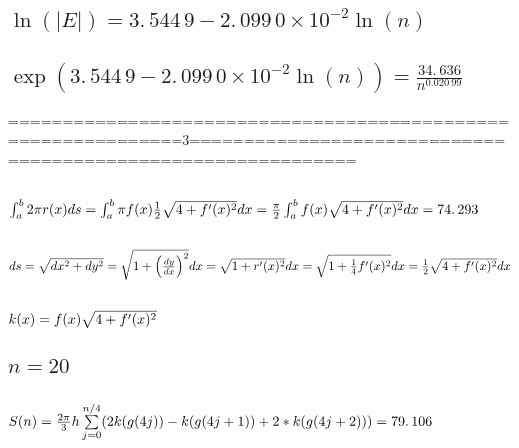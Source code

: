 \documentclass{article}
\begin{document}
\subsection{$\ln (|E|)=3.\,\allowbreak 544\,9-2.\,\allowbreak 099\,0\times
10^{-2}\ln (n)$}

\subsection{$\exp (3.\,\allowbreak 544\,9-2.\,\allowbreak 099\,0\times
10^{-2}\ln (n))=\allowbreak \frac{34.\,\allowbreak 636}{n^{0.020\,99}}$}

==============================================================3=============================================================

\bigskip

\subsection{$\protect\int_{a}^{b}2\protect\pi r(x)ds=\protect\int_{a}^{b}%
\protect\pi f(x)\frac{1}{2}\protect\sqrt{4+f^{\prime }(x)^{2}}dx=\frac{%
\protect\pi }{2}\protect\int_{a}^{b}f(x)\protect\sqrt{4+f^{\prime }(x)^{2}}%
dx=\allowbreak 74.\,\allowbreak 293$}

\subsection{$ds=\protect\sqrt{dx^{2}+dy^{2}}=\protect\sqrt{1+\left( \frac{dy%
}{dx}\right) ^{2}}dx=\protect\sqrt{1+r^{\prime }(x)^{2}}dx=\protect\sqrt{1+%
\frac{1}{4}f^{\prime }(x)^{2}}dx=\frac{1}{2}\protect\sqrt{4+f^{\prime
}(x)^{2}}dx$}

\subsection{$k(x)=f(x)\protect\sqrt{4+f^{\prime }(x)^{2}}$}

\bigskip

\bigskip

\subsection{$n=20$}

\subsection{$S(n)=\frac{2\protect\pi }{3}h\sum%
\limits_{j=0}^{n/4}(2k(g(4j))-k(g(4j+1))+2\ast k(g(4j+2)))=79.\,\allowbreak
106\allowbreak $}
\end{document}
